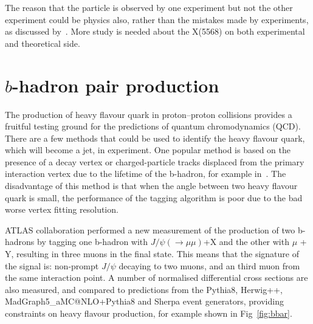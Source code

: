 \documentclass[epj]{webofc}
\begin{document}
The reason that the particle is observed by one experiment but not the other experiment could be physics also, rather than the mistakes
made by experiments, as discussed by~\cite{Yang:2016sws}\cite{Ke:2018stp}. More study is needed about the X(5568) on both experimental and theoretical side. 


\section{$b$-hadron pair production}

The production of heavy flavour quark in proton–proton collisions provides a fruitful testing ground for the predictions of quantum chromodynamics (QCD).
There are a few methods that could be used to identify the heavy flavour quark, which will become a jet, in experiment. 
One popular method is based on the presence of a decay vertex or charged-particle tracks displaced from the primary interaction vertex 
due to the lifetime of the b-hadron, for example in~\cite{Aaboud:2016jed}. The disadvantage of this method is that when the angle
between two heavy flavour quark is small, the performance of the tagging algorithm is poor due to the bad worse vertex fitting resolution. 

ATLAS collaboration performed a new measurement of the production of two b-hadrons by tagging one b-hadron with $J/\psi (\to \mu \mu)$+X and the other with $\mu$ + Y, 
resulting in three muons in the final state. This means that the signature of the signal is: non-prompt $J/\psi$ decaying to two muons, and an third muon from the same
interaction point.
A number of normalised differential cross sections are also measured, and compared to predictions from the Pythia8, Herwig++, MadGraph5\_aMC@NLO+Pythia8 
and Sherpa event generators, providing constraints on heavy flavour production, for example shown in Fig~\ref{fig:bbar}. 
\end{document}

